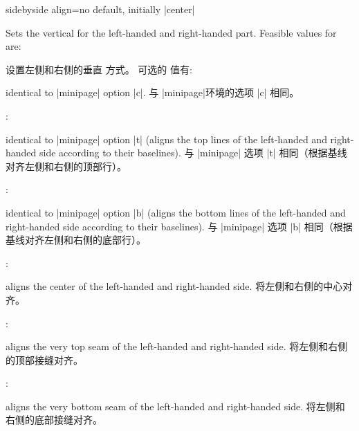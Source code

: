 \begin{docTcbKey}[][doc updated=2015-02-06]{sidebyside align}{=}{no default, initially |center|}

Sets the vertical  for the left-handed and right-handed part.%
Feasible values for  are:

设置左侧和右侧的垂直  方式。%
可选的  值有:

\begin{description}
    \item{}
\begin{tcolorbox}[box align=center,blanker,nobeforeafter]
identical to |minipage| option |c|.
\tcblower
与 |minipage|环境的选项 |c| 相同。
\end{tcolorbox}

\item{}:    
\begin{tcolorbox}[box align=center,blanker,nobeforeafter]
identical to |minipage| option |t| (aligns the top lines of the left-handed and right-handed side according to their baselines).
\tcblower
与 |minipage| 选项 |t| 相同（根据基线对齐左侧和右侧的顶部行）。
\end{tcolorbox}
  
\item{}: 
\begin{tcolorbox}[box align=center,blanker,nobeforeafter]
identical to |minipage| option |b| (aligns the bottom lines of the left-handed and right-handed side according to their baselines).
\tcblower
与 |minipage| 选项 |b| 相同（根据基线对齐左侧和右侧的底部行）。
\end{tcolorbox}

\item{}: 
\begin{tcolorbox}[box align=center,blanker,nobeforeafter]
aligns the center of the left-handed and right-handed side.
\tcblower
将左侧和右侧的中心对齐。
\end{tcolorbox}

\item{}:    
\begin{tcolorbox}[box align=center,blanker,nobeforeafter]
aligns the very top seam of the left-handed and right-handed side.
\tcblower
将左侧和右侧的顶部接缝对齐。
\end{tcolorbox}
  
\item{}: 
\begin{tcolorbox}[box align=center,blanker,nobeforeafter]
aligns the very bottom seam of the left-handed and right-handed side.
\tcblower
将左侧和右侧的底部接缝对齐。
\end{tcolorbox}
        


\end{description}
\end{docTcbKey}
